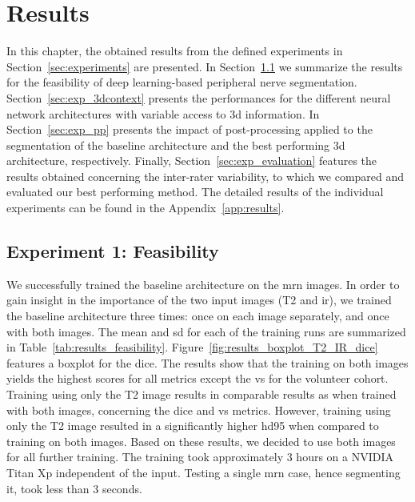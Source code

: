 \chapter{Results} \label{chap:results}
In this chapter, the obtained results from the defined experiments in Section~\ref{sec:experiments} are presented. In Section~\ref{sec:exp_feas} we summarize the results for the feasibility of deep learning-based peripheral nerve segmentation.
Section~\ref{sec:exp_3dcontext} presents the performances for the different neural network architectures with variable access to \gls{3d} information.
In Section~\ref{sec:exp_pp} presents the impact of post-processing applied to the segmentation of the baseline architecture and the best performing \gls{3d} architecture, respectively.
Finally, Section~\ref{sec:exp_evaluation} features the results obtained concerning the inter-rater variability, to which we compared and evaluated our best performing method.
The detailed results of the individual experiments can be found in the Appendix~\ref{app:results}.

\section{Experiment 1: Feasibility} \label{sec:exp_feas} %
We successfully trained the baseline architecture on the \gls{mrn} images. In order to gain insight in the importance of the two input images (T2 and \gls{ir}), we trained the baseline architecture three times: once on each image separately, and once with both images. The mean and \gls{sd} for each of the training runs are summarized in Table~\ref{tab:results_feasibility}. Figure~\ref{fig:results_boxplot_T2_IR_dice} features a boxplot for the \acrlong{dice}. The results show that the training on both images yields the highest scores for all metrics except the \acrlong{vs} for the volunteer cohort. Training using only the T2 image results in comparable results as when trained with both images, concerning the \gls{dice} and \gls{vs} metrics. However, training using only the T2 image resulted in a significantly higher \gls{hd95} when compared to training on both images. Based on these results, we decided to use both images for all further training. The training took approximately 3 hours on a NVIDIA Titan Xp independent of the input. Testing a single \gls{mrn} case, hence segmenting it, took less than 3 seconds.

